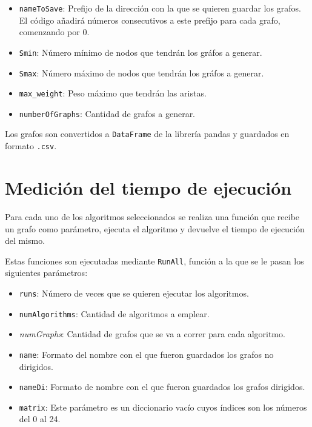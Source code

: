 \documentclass{article}
\begin{document}
\begin{itemize}
\item \texttt{nameToSave}: Prefijo de la dirección con la que se quieren guardar los grafos. El código añadirá números consecutivos a este prefijo para cada grafo, comenzando por 0.
\item \texttt{Smin}: Número mínimo de nodos que tendrán los gráfos a generar.
\item \texttt{Smax}: Número máximo de nodos que tendrán los gráfos a generar.
\item \texttt{max\_weight}: Peso máximo que tendrán las aristas.
\item \texttt{numberOfGraphs}: Cantidad de grafos a generar.
\end{itemize}

Los grafos son convertidos a \texttt{DataFrame} de la librería pandas \cite{pandas} y guardados en formato \texttt{.csv}.
 

\section*{Medición del tiempo de ejecución}

Para cada uno de los algoritmos seleccionados se realiza una función que recibe un grafo como parámetro, ejecuta el algoritmo y devuelve el tiempo de ejecución del mismo. 

 

Estas funciones son ejecutadas mediante \texttt{RunAll}, función a la que se le pasan los siguientes parámetros:
\begin{itemize}
\item \texttt{runs}: Número de veces que se quieren ejecutar los algoritmos.
\item \texttt{numAlgorithms}: Cantidad de algoritmos a emplear.
\item \textit{numGraphs}: Cantidad de grafos que se va a correr para cada algoritmo.
\item \texttt{name}: Formato del nombre con el que fueron guardados los grafos no dirigidos.
\item \texttt{nameDi}: Formato de nombre con el que fueron guardados los grafos dirigidos.
\item \texttt{matrix}: Este parámetro es un diccionario vacío cuyos índices son los números del 0 al 24.
\end{itemize}
\end{document}
